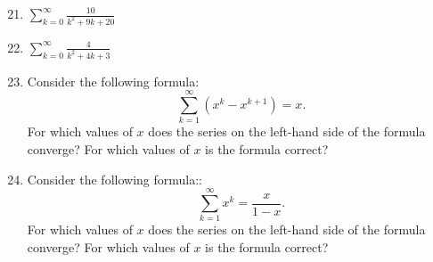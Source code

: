 \documentclass[12pt]{article}
\newif\ifans
\begin{document}
\begin{enumerate}
\setcounter{enumi}{20}

\item $\sum_{k=0}^{\infty}\frac{10}{k^2+9k+20}$

\ifans{\fbox{$\frac{5}{2}$}} \fi
 
\item $\sum_{k=0}^{\infty}\frac{4}{k^2+4k+3}$

\ifans{\fbox{$3$; Detailed Solution: \textcolor{blue}{\href{http://www.math.drexel.edu/classes/Calculus/resources/Math123HW/Solutions/123_07_Series_22.pdf}{Here}}}} \fi

\item Consider the following formula: $$\sum_{k=1}^{\infty} (x^{k}-x^{k+1})=x.$$ For which values of $x$ does 
the series on the left-hand side of the formula converge?  For which values of $x$ is the formula correct?

\ifans{\fbox{\parbox{1\linewidth}{This is a telescoping series with an $n^{\mathit{th}}$ partial sum of $s_n=x-x^{n+1}$.  
\\ Now  $\textstyle \lim\limits_{n \rightarrow +\infty}\left(x-x^{n+1}\right)$ equals $x$ if
$-1<x<1$ and equals $0$ if $x=1$.  So the series converges if $-1<x\leq1$, but the formula is only correct if $-1<x<1$. }}} \fi

\item Consider the following formula:: $$\sum_{k=1}^{\infty}x^{k}=\frac{x}{1-x}.$$  For which values of $x$ does
the series on the left-hand side of the formula converge?  For which values of $x$ is the formula correct?

\ifans{\fbox{\parbox{1\linewidth}{This is a geometric series with $a=x$ and $r=x$.  Thus the series converges only if \\  $|x|<1$, i.e. $-1<x<1$.  If this is true, then the sum of the series is
$\textstyle \frac{a}{1-r}=\frac{x}{1-x}$.  So the formula is true if $-1<x<1$.  }}} \fi

\end{enumerate}
\end{document}

